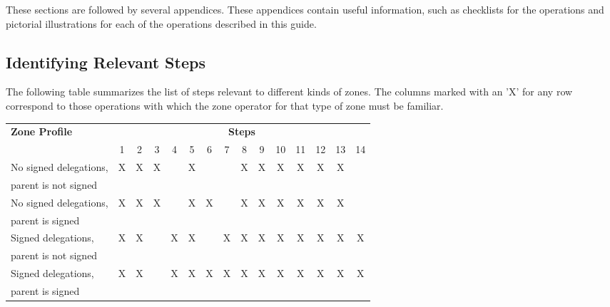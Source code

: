These sections are followed by several appendices.  These appendices contain
useful information, such as checklists for the operations and pictorial
illustrations for each of the operations described in this guide.


\subsection{Identifying Relevant Steps}

The following table summarizes the list of steps relevant to different kinds
of zones. The columns marked with an 'X' for any row correspond to those
operations with which the zone operator for that type of zone must be
familiar.

\begin{center}
\begin{tabular}{|l|c|c|c|c|c|c|c|c|c|c|c|c|c|c|}
\hline
{\bf Zone Profile} & \multicolumn{14}{c|}{{\bf Steps}} \\
\cline{2-15}
 & 1 & 2 & 3 & 4 & 5 & 6 & 7 & 8 & 9 & 10 & 11 & 12 & 13 & 14 \\
\hline
No signed delegations, & X & X & X &   & X &   &   & X & X & X & X & X & X & \\
parent is not signed   &   &   &   &   &   &   &   &   &   &   &   &   &   & \\
\hline
No signed delegations, & X & X & X &   & X & X &   & X & X & X & X & X & X & \\
parent is signed       &   &   &   &   &   &   &   &   &   &   &   &   &   & \\
\hline
Signed delegations,    & X & X &   & X & X &   & X & X & X & X & X & X & X & X\\
parent is not signed   &   &   &   &   &   &   &   &   &   &   &   &   &   &  \\
\hline
Signed delegations,    & X & X &   & X & X & X & X & X & X & X & X & X & X & X\\
parent is signed       &   &   &   &   &   &   &   &   &   &   &   &   &   &  \\
\hline
\end{tabular}
\end{center}


